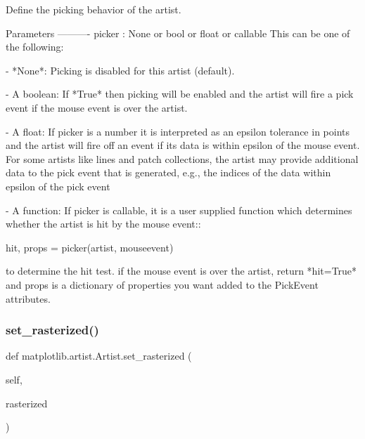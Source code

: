 \begin{DoxyVerb}Define the picking behavior of the artist.

Parameters
----------
picker : None or bool or float or callable
    This can be one of the following:

    - *None*: Picking is disabled for this artist (default).

    - A boolean: If *True* then picking will be enabled and the
      artist will fire a pick event if the mouse event is over
      the artist.

    - A float: If picker is a number it is interpreted as an
      epsilon tolerance in points and the artist will fire
      off an event if its data is within epsilon of the mouse
      event.  For some artists like lines and patch collections,
      the artist may provide additional data to the pick event
      that is generated, e.g., the indices of the data within
      epsilon of the pick event

    - A function: If picker is callable, it is a user supplied
      function which determines whether the artist is hit by the
      mouse event::

hit, props = picker(artist, mouseevent)

      to determine the hit test.  if the mouse event is over the
      artist, return *hit=True* and props is a dictionary of
      properties you want added to the PickEvent attributes.
\end{DoxyVerb}
 \mbox{\label{classmatplotlib_1_1artist_1_1Artist_a871b52481eb940ebea0bbb4a9c337f3d}} 
\subsubsection{\texorpdfstring{set\+\_\+rasterized()}{set\_rasterized()}}
{\footnotesize\ttfamily def matplotlib.\+artist.\+Artist.\+set\+\_\+rasterized (\begin{DoxyParamCaption}\item[{}]{self,  }\item[{}]{rasterized }\end{DoxyParamCaption})}

